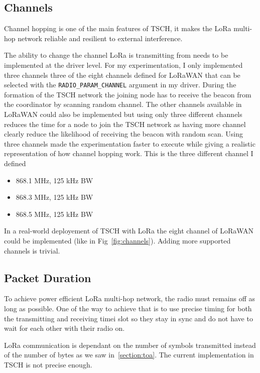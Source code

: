\subsection{Channels}

Channel hopping is one of the main features of TSCH, it makes the LoRa multi-hop
network reliable and resilient to external interference.

The ability to change the channel LoRa is transmitting from needs to be
implemented at the driver level.
For my experimentation, I only implemented three channels three of the eight
channels defined for LoRaWAN that can be selected with the \lstinline{RADIO_PARAM_CHANNEL}
argument in my driver.
During the formation of the TSCH network the joining node has to receive the beacon from
the coordinator by scanning random channel.
The other channels available in LoRaWAN could also be implemented but
using only three different channels reduces the time for a node to join
the TSCH network as having more channel clearly reduce the likelihood of
receiving the beacon with random scan.
Using three channels made the experimentation faster to execute while giving a realistic
representation of how channel hopping work.
This is the three different channel I defined

\begin{itemize}
  \item 868.1 MHz, 125 kHz BW
  \item 868.3 MHz, 125 kHz BW
  \item 868.5 MHz, 125 kHz BW
\end{itemize}

In a real-world deployement of TSCH with LoRa the eight channel of LoRaWAN
could be implemented (like in Fig~\ref{fig:channels}).
Adding more supported channels is trivial.

\subsection{Packet Duration\label{section:transmissiontime}}

To achieve power efficient LoRa multi-hop network, the radio must remains
off as long as possible.
One of the way to achieve that is to use precise timing for both the transmitting
and receiving timei slot so they stay in sync and do not have to wait for each
other with their radio on.

LoRa communication is dependant on the number of symbols transmitted
instead of the number of bytes as we saw in~\ref{section:toa}.
The current implementation in TSCH is not precise enough.


